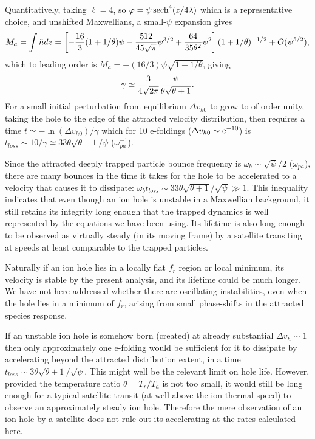 \documentclass[aip,pop,article-title]{revtex4-2}
\def\sech{{\,\rm sech}}
\begin{document}
Quantitatively, taking $\ell=4$, so $\varphi=\psi\sech^4(z/4\lambda)$ which is a
representative choice, and unshifted Maxwellians, a small-${\psi}$
expansion gives
\begin{equation}
  \label{intn}
  M_a=\int \tilde n dz = \left[-{16\over 3}(1+1/\theta){\psi}
  -{512\over 45\sqrt{\pi}}{\psi}^{3/2}
  +{64\over 35\theta^2}{\psi}^2\right](1+1/\theta)^{-1/2}+O({\psi}^{5/2}),
\end{equation}
which to leading order is
$M_a=-(16/3){\psi}\sqrt{1+1/\theta}$,
giving
\begin{equation}
  \label{gammafinal}
  \gamma\simeq{3\over4\sqrt{2\pi}}{{\psi}\over \theta\sqrt{\theta+1}}
.
\end{equation}
For a small initial perturbation from equilibrium $\Delta v_{h0}$
to grow to of order unity, taking the hole to the edge of the
attracted velocity distribution, then requires a time $t\simeq-\ln (\Delta
v_{h0})/\gamma$ which for 10 e-foldings ($\Delta v_{h0}\sim {\rm
  e}^{-10}$) is $t_{loss}\sim 10/\gamma\simeq 33
\theta\sqrt{\theta +1}/{\psi}$ ($\omega_{pa}^{-1}$). 

Since the attracted deeply trapped particle bounce frequency is
$\omega_b \sim \sqrt{\psi}/2$ ($\omega_{pa}$), there are many bounces in the time it
takes for the hole to be accelerated to a velocity that causes it to
dissipate:
$\omega_b t_{loss}\sim33 \theta\sqrt{\theta +1}/\sqrt{{\psi}} \gg
1$. This inequality indicates that even though an ion  hole is unstable in
a Maxwellian background, it still retains its integrity long enough that
the trapped dynamics is well represented by the equations we have been
using.  Its lifetime is also long enough to be observed as virtually
steady (in its moving frame) by a satellite transiting at speeds
at least comparable to the trapped particles.

Naturally if an ion hole lies in a locally flat $f_r$ region or local
minimum, its velocity is stable by the present analysis, and its
lifetime could be much longer. We have not here addressed
whether there are oscillating instabilities\cite{Hutchinson2022}, even
when the hole lies in a minimum of $f_r$, arising from small
phase-shifts in the attracted species response.


If an unstable ion hole is somehow born (created) at already
substantial $\Delta v_h\sim 1$ then only approximately one e-folding
would be sufficient for it to dissipate by accelerating beyond the
attracted distribution extent, in a time
$t_{loss} \sim 3 \theta\sqrt{\theta +1}/\sqrt{{\psi}}$. This might
well be the relevant limit on hole life.  However, provided the
temperature ratio $\theta=T_r/T_a$ is not too small, it would still be
long enough for a typical satellite transit (at well above the ion
thermal speed) to observe an approximately steady ion hole. Therefore
the mere observation of an ion hole by a satellite does not rule out
its accelerating at the rates calculated here.
\end{document}
